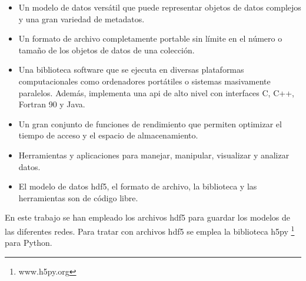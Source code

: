 \begin{itemize}
    \item Un modelo de datos versátil que puede representar objetos de datos complejos y una gran variedad de metadatos.
    
    \item Un formato de archivo completamente portable sin límite en el número o tamaño de los objetos de datos de una colección.
    
    \item Una biblioteca software que se ejecuta en diversas plataformas computacionales como ordenadores portátiles o sistemas masivamente paralelos. Además, implementa una \acrshort{api} de alto nivel con interfaces C, C++, Fortran 90 y Java.
    
    \item Un gran conjunto de funciones de rendimiento que permiten optimizar el tiempo de acceso y el espacio de almacenamiento.
    
    \item Herramientas y aplicaciones para manejar, manipular, visualizar y analizar datos.
    
    \item El modelo de datos \acrshort{hdf5}, el formato de archivo, la biblioteca y las herramientas son de código libre.
\end{itemize}

En este trabajo se han empleado los archivos \acrshort{hdf5} para guardar los modelos de las diferentes redes. Para tratar con archivos \acrshort{hdf5} se emplea la biblioteca h5py \footnote{www.h5py.org} para Python.

